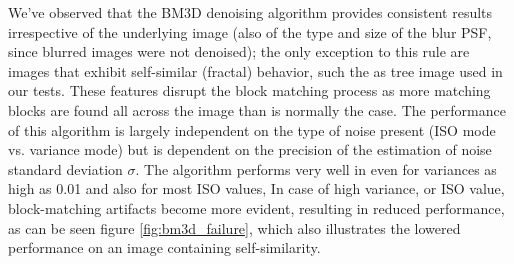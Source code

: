 \documentclass[12pt,notitlepage]{report}
\begin{document}





We've observed that the BM3D denoising algorithm provides consistent results irrespective of the underlying image (also of the type and size of the blur PSF, since blurred images were not denoised); the only exception to this rule are images that exhibit self-similar (fractal) behavior, such the as tree image used in our tests. These features disrupt the block matching process as more matching blocks are found all across the image than is normally the case. The performance of this algorithm is largely independent on the type of noise present (ISO mode vs. variance mode) but is dependent on the precision of the estimation of noise standard deviation $\sigma$. The algorithm performs very well in even for variances as high as 0.01 and also for most ISO values, In case of high variance, or ISO value, block-matching artifacts become more evident, resulting in reduced performance, as can be seen figure \ref{fig:bm3d_failure}, which also illustrates the lowered performance on an image containing self-similarity. 

\clearpage  
\end{document}
